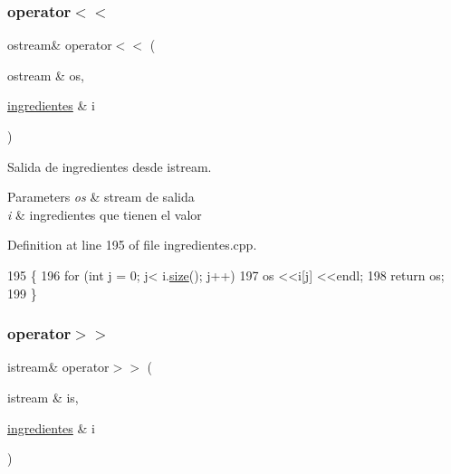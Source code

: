 \subsubsection{\texorpdfstring{operator$<$$<$}{operator<<}}
{\footnotesize\ttfamily ostream\& operator$<$$<$ (\begin{DoxyParamCaption}\item[{ostream \&}]{os,  }\item[{\hyperlink{classingredientes}{ingredientes} \&}]{i }\end{DoxyParamCaption})\hspace{0.3cm}{\ttfamily [friend]}}



Salida de ingredientes desde istream. 


\begin{DoxyParams}{Parameters}
{\em os} & stream de salida \\
\hline
{\em i} & ingredientes que tienen el valor \\
\hline
\end{DoxyParams}


Definition at line 195 of file ingredientes.\+cpp.


\begin{DoxyCode}
195                                                   \{
196     \textcolor{keywordflow}{for} (\textcolor{keywordtype}{int} j = 0; j< i.\hyperlink{classingredientes_a642511344976e22479ae78e4ee2917f9}{size}(); j++)
197         os <<i[j] <<endl;
198     \textcolor{keywordflow}{return} os;
199 \}
\end{DoxyCode}
\mbox{\label{classingredientes_a1ab0c9c6bff343a083f9cf9296b31438}} 
\subsubsection{\texorpdfstring{operator$>$$>$}{operator>>}}
{\footnotesize\ttfamily istream\& operator$>$$>$ (\begin{DoxyParamCaption}\item[{istream \&}]{is,  }\item[{\hyperlink{classingredientes}{ingredientes} \&}]{i }\end{DoxyParamCaption})\hspace{0.3cm}{\ttfamily [friend]}}



